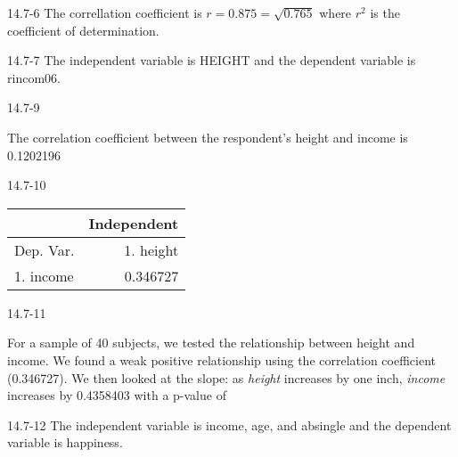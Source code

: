\begin{exsol@solution}{14.7-6}
       The correllation coefficient is $r = 0.875 = \sqrt{0.765}$ where  $r^2$ is the coefficient of determination.
\end{exsol@solution}
\begin{exsol@solution}{14.7-7}
       The independent variable is HEIGHT and the dependent variable is rincom06.
\end{exsol@solution}
\begin{exsol@solution}{14.7-9}

       The correlation coefficient between the respondent's height and income is 0.1202196

\end{exsol@solution}
\begin{exsol@solution}{14.7-10}

       \begin{table}[ht]
    \centering
    \begin{tabular}{lr} \hline
        &  \multicolumn{1}{c}{Independent} \\ \hline

    Dep. Var. & 1. height      \\ \hline
    1. income  &   0.346727      \\ \hline

    \end{tabular}
    \end{table}


\end{exsol@solution}
\begin{exsol@solution}{14.7-11}

    For a sample of 40 subjects, we tested the relationship between height and income.  We found a weak positive relationship using the correlation coefficient (0.346727).  We then looked at the slope:  as {\textit{height}} increases by one inch, {\textit{income}} increases by 0.4358403 with a p-value of


\end{exsol@solution}
\begin{exsol@solution}{14.7-12}
       The independent variable is income,   age, and absingle and the dependent variable is happiness.
\end{exsol@solution}
